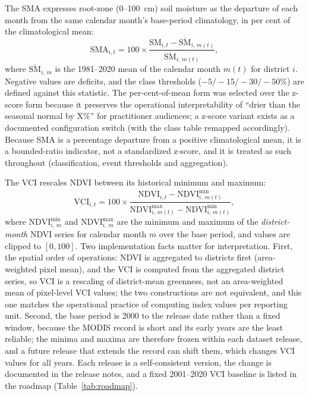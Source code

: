 \documentclass[10pt,a4paper]{article}
\begin{document}
The SMA expresses root-zone (0--100~cm) soil moisture as the departure of each month from the same calendar month's base-period climatology, in per cent of the climatological mean:
\[
\mathrm{SMA}_{i,t}=100\times\frac{\mathrm{SM}_{i,t}-\overline{\mathrm{SM}}_{i,\,m(t)}}{\overline{\mathrm{SM}}_{i,\,m(t)}},
\]
where $\overline{\mathrm{SM}}_{i,\,m}$ is the 1981--2020 mean of the calendar month $m(t)$ for district $i$. Negative values are deficits, and the class thresholds ($-5/-15/-30/-50$\%) are defined against this statistic. The per-cent-of-mean form was selected over the z-score form because it preserves the operational interpretability of ``drier than the seasonal normal by X\%'' for practitioner audiences; a z-score variant exists as a documented configuration switch (with the class table remapped accordingly). Because SMA is a percentage departure from a positive climatological mean, it is a bounded-ratio indicator, not a standardized z-score, and it is treated as such throughout (classification, event thresholds and aggregation).

The VCI rescales NDVI between its historical minimum and maximum\citep{Kogan1995}:
\[
\mathrm{VCI}_{i,t}=100\times\frac{\mathrm{NDVI}_{i,t}-\mathrm{NDVI}^{\min}_{i,\,m(t)}}{\mathrm{NDVI}^{\max}_{i,\,m(t)}-\mathrm{NDVI}^{\min}_{i,\,m(t)}},
\]
where $\mathrm{NDVI}^{\min}_{i,\,m}$ and $\mathrm{NDVI}^{\max}_{i,\,m}$ are the minimum and maximum of the \emph{district-month} NDVI series for calendar month $m$ over the base period, and values are clipped to $[0,100]$. Two implementation facts matter for interpretation. First, the spatial order of operations: NDVI is aggregated to districts first (area-weighted pixel mean), and the VCI is computed from the aggregated district series, so VCI is a rescaling of district-mean greenness, not an area-weighted mean of pixel-level VCI values; the two constructions are not equivalent, and this one matches the operational practice of computing index values per reporting unit. Second, the base period is 2000 to the release date rather than a fixed window, because the MODIS record is short and its early years are the least reliable; the minima and maxima are therefore frozen within each dataset release, and a future release that extends the record can shift them, which changes VCI values for all years. Each release is a self-consistent version, the change is documented in the release notes, and a fixed 2001--2020 VCI baseline is listed in the roadmap (Table~\ref{tab:roadmap}).
\end{document}
